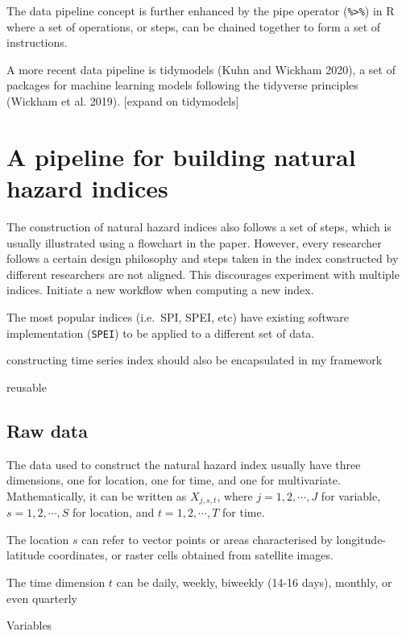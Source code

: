 \documentclass[
]{article}
\begin{document}
The data pipeline concept is further enhanced by the pipe operator
(\texttt{\%\textgreater{}\%}) in R where a set of operations, or steps,
can be chained together to form a set of instructions.

A more recent data pipeline is tidymodels (Kuhn and Wickham 2020), a set
of packages for machine learning models following the tidyverse
principles (Wickham et al. 2019). {[}expand on tidymodels{]}

\hypertarget{a-pipeline-for-building-natural-hazard-indices}{%
\section{A pipeline for building natural hazard
indices}\label{a-pipeline-for-building-natural-hazard-indices}}

The construction of natural hazard indices also follows a set of steps,
which is usually illustrated using a flowchart in the paper. However,
every researcher follows a certain design philosophy and steps taken in
the index constructed by different researchers are not aligned. This
discourages experiment with multiple indices. Initiate a new workflow
when computing a new index.

The most popular indices (i.e.~SPI, SPEI, etc) have existing software
implementation (\texttt{SPEI}) to be applied to a different set of data.

constructing time series index should also be encapsulated in my
framework

reusable

\hypertarget{raw-data}{%
\subsection{Raw data}\label{raw-data}}

The data used to construct the natural hazard index usually have three
dimensions, one for location, one for time, and one for multivariate.
Mathematically, it can be written as \(X_{j, s, t}\), where
\(j = 1, 2, \cdots, J\) for variable, \(s = 1, 2, \cdots, S\) for
location, and \(t = 1, 2, \cdots, T\) for time.

The location \(s\) can refer to vector points or areas characterised by
longitude-latitude coordinates, or raster cells obtained from satellite
images.

The time dimension \(t\) can be daily, weekly, biweekly (14-16 days),
monthly, or even quarterly

Variables
\end{document}
